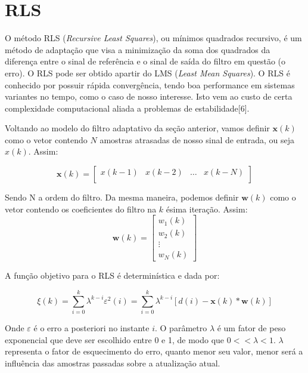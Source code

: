 \documentclass[a4paper, 12pt]{book}
\begin{document}
\section{RLS}

\indent O método RLS (\textit{Recursive Least Squares}), ou mínimos quadrados recursivo, é um método de adaptação que visa a minimização da soma dos quadrados da diferença entre o sinal de referência e o sinal de saída do filtro em questão (o erro). O RLS pode ser obtido apartir do LMS (\textit{Least Mean Squares}). O RLS é conhecido por possuir rápida convergência, tendo boa performance em sistemas variantes no tempo, como o caso de nosso interesse. Isto vem ao custo de certa complexidade computacional aliada a problemas de estabilidade[6].

\indent Voltando ao modelo do filtro adaptativo da seção anterior, vamos definir $\boldsymbol{x}(k)$ como o vetor contendo $N$ amostras atrasadas de nosso sinal de entrada, ou seja $x(k)$. Assim:

\begin{equation}
\boldsymbol{x}(k)=
\begin{bmatrix}
x(k-1) & x(k-2) & \dots & x(k-N) \\
\end{bmatrix}
\end{equation}

\indent Sendo N a ordem do filtro. Da mesma maneira, podemos definir $\boldsymbol{w}(k)$ como o vetor contendo os coeficientes do filtro na $k$ ésima iteração. Assim:
\begin{equation}
\boldsymbol{w}(k)=
\begin{bmatrix}
w_{1}(k)  \\
w_{2}(k)  \\
\vdots  \\
w_{N}(k) 
\end{bmatrix}
\end{equation}

\indent A função objetivo para o RLS é determinística e dada por:

\Large
\begin{equation}
\xi(k)=\sum_{i=0}^{k}\lambda^{k-i}\varepsilon^2(i)
=\sum_{i=0}^{k}\lambda^{k-i}[d(i)-\boldsymbol{x}(k)*\boldsymbol{w}(k)]
\end{equation}
\normalsize

\indent Onde $\varepsilon$ é o erro a posteriori no instante $i$. O parâmetro $\lambda$ é um fator de peso exponencial que deve ser escolhido entre 0 e 1, de modo que $0 << \lambda < 1$. $\lambda$ representa o fator de esquecimento do erro, quanto menor seu valor, menor será a influência das amostras passadas sobre a atualização atual.
\end{document}
